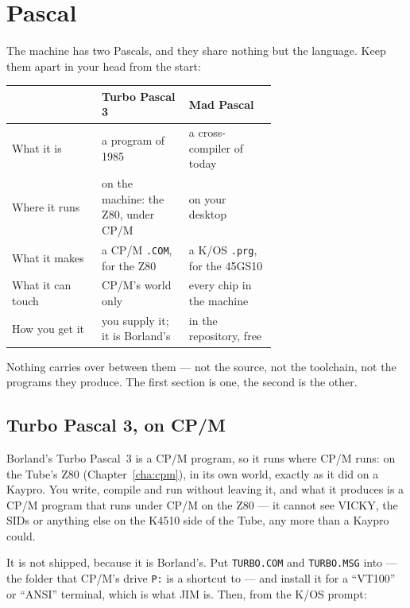 \chapter{Pascal}\label{cha:pascal}

The machine has two Pascals, and they share nothing but the language.
Keep them apart in your head from the start:

\begin{center}
\small
\begin{tabular}{@{}l >{\raggedright\arraybackslash}p{0.33\linewidth} >{\raggedright\arraybackslash}p{0.33\linewidth}@{}}
\toprule
 & \textbf{Turbo Pascal 3} & \textbf{Mad Pascal} \\
\midrule
What it is & a program of 1985 & a cross-compiler of today \\
Where it runs & on the machine: the Z80, under CP/M & on your desktop \\
What it makes & a CP/M \texttt{.COM}, for the Z80 & a K/OS \texttt{.prg}, for the 45GS10 \\
What it can touch & CP/M's world only & every chip in the machine \\
How you get it & you supply it; it is Borland's & in the repository, free \\
\bottomrule
\end{tabular}
\end{center}

\noindent Nothing carries over between them --- not the source, not the
toolchain, not the programs they produce. The first section is one, the
second is the other.

\section{Turbo Pascal 3, on CP/M}
Borland's Turbo Pascal~3 is a CP/M program, so it runs where CP/M runs:
on the Tube's Z80 (Chapter~\ref{cha:cpm}), in its own world, exactly as
it did on a Kaypro. You write, compile and run without leaving it, and
what it produces is a CP/M program that runs under CP/M on the Z80 ---
it cannot see VICKY, the SIDs or anything else on the K4510 side of the
Tube, any more than a Kaypro could.

It is not shipped, because it is Borland's. Put \texttt{TURBO.COM} and
\texttt{TURBO.MSG} into  --- the folder that CP/M's
drive \verb|P:| is a shortcut to --- and install it for a ``VT100'' or
``ANSI'' terminal, which is what JIM is. Then, from the K/OS prompt:

